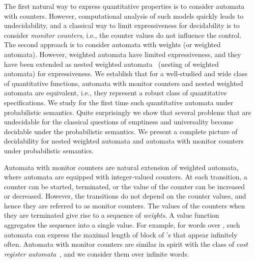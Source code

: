 \documentclass{lmcs}
\begin{document}
\smallskip{}
The first natural way to express quantitative properties is to
consider automata with counters.
However, computational analysis of such models quickly leads to
undecidability, and a classical way to limit expressiveness for
decidability is to consider {\em monitor counters}, i.e.,
the counter values do not influence the control.
The second approach is to consider automata with weights
(or weighted automata).
However, weighted automata have limited expressiveness, and
they have been extended as nested weighted automata~\cite{nested}
(nesting of weighted automata) for expressiveness.
We establish that for a well-studied and wide class of quantitative
functions, automata with monitor counters and nested weighted
automata are equivalent, i.e., they represent a robust class of
quantitative specifications.
We study for the first time such quantitative automata under
probabilistic semantics.
Quite surprisingly we show that several problems that are undecidable
for the classical questions of emptiness and universality become
decidable under the probabilistic semantics.
We present a complete picture of decidability for nested weighted
automata and automata with monitor counters under probabilistic semantics.



\smallskip{}
Automata with monitor counters are natural extension of weighted automata, where
automata are equipped with integer-valued counters.
At each transition, a counter can be started, terminated, or the value
of the counter can be increased or decreased.
However, the transitions
do not depend on the counter values, and hence they are referred to as
monitor counters.
The values of the counters when they are terminated give rise to
a sequence of \emph{weights}.
A value function aggregates the sequence into a single value.
For example, for words over , such automata can express
the maximal length of block of 's that appear infinitely often.
Automata with monitor counters are similar in spirit with the class
of \emph{cost register automata}~\cite{DBLP:conf/lics/AlurDDRY13}, and
we consider them over infinite words.
\end{document}
